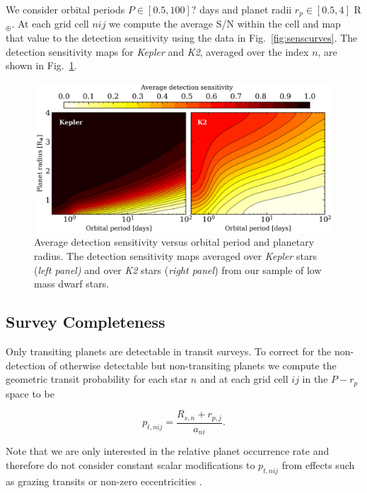 \documentclass[twocolumn]{emulateapj}
\newcommand{\kepler}[1]{\emph{Kepler}#1}
\newcommand{\ktwo}[1]{\emph{K2}#1}
\begin{document}
We consider orbital periods $P \in [0.5,100]?$ days and planet radii $r_p \in [0.5,4]$ R$_{\oplus}$. At
each grid cell $nij$ we compute the average S/N within the cell and map that value to the detection sensitivity
using the data in Fig.~\ref{fig:senscurves}. The detection sensitivity maps for \kepler{} and \ktwo{,}
averaged over the index $n$, are shown in Fig.~\ref{fig:sensmap}.

 

\begin{figure}
  \centering
  \includegraphics[width=0.98\hsize]{figures/sensmap.png}
  \caption{Average detection sensitivity versus orbital period and planetary radius.
    The detection sensitivity maps averaged over \kepler{} stars (\emph{left panel)} and over \ktwo{} stars
    (\emph{right panel}) from our sample of low mass dwarf stars.} 
  \label{fig:sensmap}
\end{figure}


\subsection{Survey Completeness}
Only transiting planets are detectable in transit surveys. To correct for the non-detection of otherwise
detectable but non-transiting planets we compute
the geometric transit probability for each star $n$ and at each grid cell $ij$ in the $P-r_p$ space to be

\begin{equation}
  p_{t,nij} = \frac{R_{s,n} + r_{p,j}}{a_{ni}}. \label{eq:ptransit}
\end{equation}

\noindent Note that we are only interested in the relative planet occurrence rate and therefore do not consider
constant scalar modifications to $p_{t,nij}$ from effects such as grazing transits or non-zero eccentricities 
\citep{barnes07b}.
\end{document}
